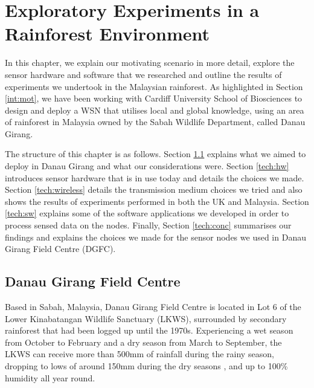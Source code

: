 \chapter{Exploratory Experiments in a Rainforest Environment}\label{chap:technical}
	In this chapter, we explain our motivating scenario in more detail, explore the sensor hardware and software that we researched and outline the results of experiments we undertook in the Malaysian rainforest. As highlighted in Section \ref{int:mot}, we have been working with Cardiff University School of Biosciences to design and deploy a WSN that utilises local and global knowledge, using an area of rainforest in Malaysia owned by the Sabah Wildlife Department, called Danau Girang.

The structure of this chapter is as follows. Section \ref{tech:motiv} explains what we aimed to deploy in Danau Girang and what our considerations were. Section \ref{tech:hw} introduces sensor hardware that is in use today and details the choices we made. Section \ref{tech:wireless} details the transmission medium choices we tried and also shows the results of experiments performed in both the UK and Malaysia. Section \ref{tech:sw} explains some of the software applications we developed in order to process sensed data on the nodes. Finally, Section \ref{tech:conc} summarises our findings and explains the choices we made for the sensor nodes we used in Danau Girang Field Centre (DGFC). 

\section{Danau Girang Field Centre}\label{tech:motiv}
Based in Sabah, Malaysia, Danau Girang Field Centre is located in Lot 6 of the Lower Kinabatangan Wildlife Sanctuary (LKWS), surrounded by secondary rainforest that had been logged up until the 1970s. Experiencing a wet season from October to February and a dry season from March to September, the LKWS can receive more than 500mm of rainfall during the rainy season, dropping to lows of around 150mm during the dry seasons \cite{Walsh2009}, and up to 100\% humidity all year round. 

